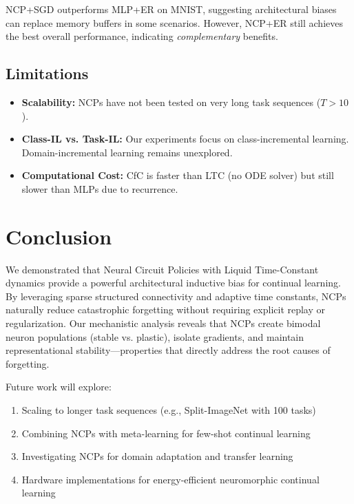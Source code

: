 \documentclass[11pt,twocolumn]{article}
\begin{document}
NCP+SGD outperforms MLP+ER on MNIST, suggesting architectural biases can replace memory buffers in some scenarios. However, NCP+ER still achieves the best overall performance, indicating \textit{complementary} benefits.

\subsection{Limitations}

\begin{itemize}
    \item \textbf{Scalability:} NCPs have not been tested on very long task sequences ($T > 10$).
    \item \textbf{Class-IL vs. Task-IL:} Our experiments focus on class-incremental learning. Domain-incremental learning remains unexplored.
    \item \textbf{Computational Cost:} CfC is faster than LTC (no ODE solver) but still slower than MLPs due to recurrence.
\end{itemize}

\section{Conclusion}

We demonstrated that Neural Circuit Policies with Liquid Time-Constant dynamics provide a powerful architectural inductive bias for continual learning. By leveraging sparse structured connectivity and adaptive time constants, NCPs naturally reduce catastrophic forgetting without requiring explicit replay or regularization. Our mechanistic analysis reveals that NCPs create bimodal neuron populations (stable vs. plastic), isolate gradients, and maintain representational stability—properties that directly address the root causes of forgetting.

Future work will explore:
\begin{enumerate}
    \item Scaling to longer task sequences (e.g., Split-ImageNet with 100 tasks)
    \item Combining NCPs with meta-learning for few-shot continual learning
    \item Investigating NCPs for domain adaptation and transfer learning
    \item Hardware implementations for energy-efficient neuromorphic continual learning
\end{enumerate}




\end{document}
